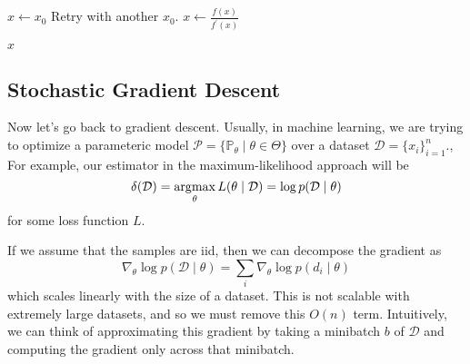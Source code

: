   \begin{algo}
    \begin{algorithm}[H]
    \label{alg:newton-raphson}
    \begin{algorithmic}[1]  %

      \State $x \gets x_0$ 
          \State Retry with another $x_0$.  
        \EndIf
        \State $x \gets \frac{f(x)}{f^\prime (x)}$
      \EndWhile
          
      \State \Return $x$ 
      \EndProcedure
    \end{algorithmic}
    \end{algorithm}
  \end{algo}

\subsection{Stochastic Gradient Descent} 

  Now let's go back to gradient descent. Usually, in machine learning, we are trying to optimize a parameteric model $\mathcal{P} = \{ \mathbb{P}_\theta \mid \theta \in \Theta\}$ over a dataset $\mathcal{D} = \{x_i\}_{i=1}^n$., For example, our estimator in the maximum-likelihood approach will be 
  \begin{equation}
    \delta(\mathcal{D}) = \argmax_{\theta} L(\theta \mid \mathcal{D}) = \log p(\mathcal{D} \mid \theta)
  \end{equation}
  for some loss function $L$. 

  If we assume that the samples are iid, then we can decompose the gradient as 
  \begin{equation}
    \nabla_\theta \log{p(\mathcal{D} \mid \theta)} = \sum_i \nabla_\theta \log{p(d_i \mid \theta)}
  \end{equation}
  which scales linearly with the size of a dataset. This is not scalable with extremely large datasets, and so we must remove this $O(n)$ term. Intuitively, we can think of approximating this gradient by taking a minibatch $b$ of $\mathcal{D}$ and computing the gradient only across that minibatch. 

